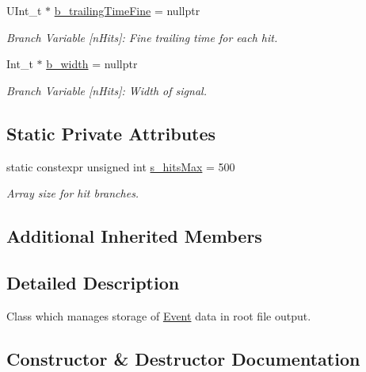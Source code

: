 \begin{DoxyCompactItemize}
U\+Int\+\_\+t $\ast$ \hyperlink{class_event_tree_manager_a6c06cd342910a86ac1db079dfd7c5da2}{b\+\_\+trailing\+Time\+Fine} = nullptr
\begin{DoxyCompactList}\small\item\em Branch Variable \mbox{[}n\+Hits\mbox{]}\+: Fine trailing time for each hit. \end{DoxyCompactList}\item 
Int\+\_\+t $\ast$ \hyperlink{class_event_tree_manager_aa65fec5d7e3a3b3983730033a6a4a7b8}{b\+\_\+width} = nullptr
\begin{DoxyCompactList}\small\item\em Branch Variable \mbox{[}n\+Hits\mbox{]}\+: Width of signal. \end{DoxyCompactList}\end{DoxyCompactItemize}
\subsection*{Static Private Attributes}
\begin{DoxyCompactItemize}
\item 
static constexpr unsigned int \hyperlink{class_event_tree_manager_aab35ad52374d52149bde894c8af7a8c5}{s\+\_\+hits\+Max} = 500
\begin{DoxyCompactList}\small\item\em Array size for hit branches. \end{DoxyCompactList}\end{DoxyCompactItemize}
\subsection*{Additional Inherited Members}


\subsection{Detailed Description}
Class which manages storage of \hyperlink{class_event}{Event} data in root file output. 

\subsection{Constructor \& Destructor Documentation}
\mbox{\label{class_event_tree_manager_ac56641a71c28863d76fcc598ac8e32df}} 
